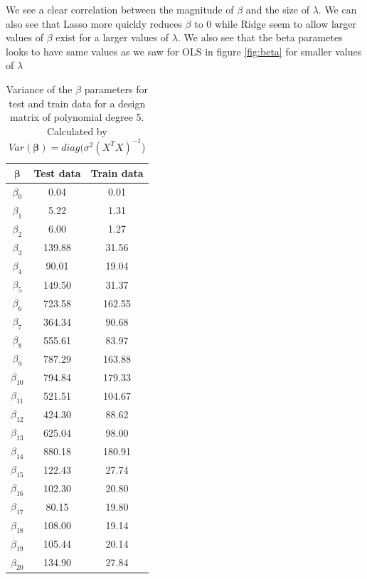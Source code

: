 \documentclass[12pt]{article}
\begin{document}
We see a clear correlation between the magnitude of $\beta$ and the size of $\lambda$. We can also see that Lasso more quickly reduces $\beta$ to 0 while Ridge seem to allow larger values of $\beta$ exist for a larger values of $\lambda$. We also see that the beta parametes looks to have same values as we saw for OLS in figure \ref{fig:beta} for smaller values of $\lambda$

\begin{table}[H]
  \caption{Variance of the $\beta$ parameters for test and train data for a design matrix of polynomial degree 5. Calculated by $Var(\boldsymbol{\beta}) = diag(\sigma^2(X^T X)^{-1}$)}
  \label{tab:beta}
  \centering
  \begin{tabular}{|c|c|c|}
    \hline
    $\boldsymbol{\beta}$ &\textbf{Test data} & \textbf{Train data} \\\hline
    $\beta_{0}$ & 0.04 & 0.01 \\
    $\beta_{1}$ & 5.22 & 1.31 \\
    $\beta_{2}$ & 6.00 & 1.27 \\
    $\beta_{3}$ & 139.88 & 31.56 \\
    $\beta_{4}$ & 90.01 & 19.04 \\
    $\beta_{5}$ & 149.50 & 31.37 \\
    $\beta_{6}$ & 723.58 & 162.55 \\
    $\beta_{7}$ & 364.34 & 90.68 \\
    $\beta_{8}$ & 555.61 & 83.97 \\
    $\beta_{9}$ & 787.29 & 163.88 \\
    $\beta_{10}$ & 794.84 & 179.33 \\
    $\beta_{11}$ & 521.51 & 104.67 \\
    $\beta_{12}$ & 424.30 & 88.62 \\
    $\beta_{13}$ & 625.04 & 98.00 \\
    $\beta_{14}$ & 880.18 & 180.91 \\
    $\beta_{15}$ & 122.43 & 27.74 \\
    $\beta_{16}$ & 102.30 & 20.80 \\
    $\beta_{17}$ & 80.15 & 19.80 \\
    $\beta_{18}$ & 108.00 & 19.14 \\
    $\beta_{19}$ & 105.44 & 20.14 \\
    $\beta_{20}$ & 134.90 & 27.84 \\
    \hline
  \end{tabular}
\end{table}
\end{document}
